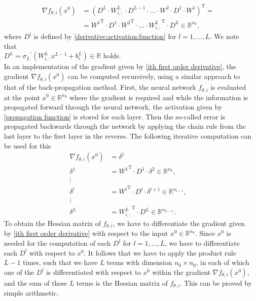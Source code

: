 \begin{equation} 
    \label{ith first order derivative}
    \begin{aligned}
        \nabla f_{\theta, i} \left(x^0\right) & = \left( D^L \cdot W^L_{i,:} \cdot D^{L-1} \cdot \ldots \cdot W^2 \cdot D^1 \cdot W^{1} \right)^{\mathrm{T}} = \\
        & = {W^{1}}^{\mathrm{T}} \cdot D^{1} \cdot {W^{2}}^{\mathrm{T}} \cdot \ldots \cdot {W^L_{i,:}}^{\mathrm{T}}  \cdot  D^{L} \in \mathbb{R}^{n_0}, 
    \end{aligned} 
\end{equation} 
where $D^l$ is defined by \cref{derivative:activation:function} for $l = 1, \ldots, L$. We note that \\
$D^L = {\sigma_{L}}^{\prime} \left( W^L_{i,:} x^{L-1} + b^{L}_{i} \right) \in \mathbb{R}$ holds.  \\
In an implementation of the gradient given by \cref{ith first order derivative}, the gradient $\nabla f_{\theta, i} \left(x^0\right)$ can be computed recursively, using a similar approach to that of the back-propagation method. First, the neural network $f_{\theta, i}$ is evaluated at the point $x^0 \in \mathbb{R}^{n_0}$ where the gradient is required and while the information is propagated forward through the neural network, the activation given by \cref{propagation function} is stored for each layer. Then the so-called error is propagated backwards through the network by applying the chain rule from the last layer to the first layer in the reverse. The following iterative computation can be used for this
\begin{equation} 
    \label{gradient recursive}
    \begin{aligned}
        \nabla f_{\theta, i} \left(x^0\right) & = \delta^1 \\
        \delta^1 & = {W^{1}}^{\mathrm{T}} \cdot D^{1} \cdot \delta^2 \in \mathbb{R}^{n_0}, \\
        \vdots & \\
        \delta^l & = {W^{l}}^{\mathrm{T}} \cdot D^{l} \cdot \delta^{l+1} \in \mathbb{R}^{n_{l-1}}, \\
        \vdots & \\
        \delta^{L} & = {W^L_{i,:}}^{\mathrm{T}} \cdot D^{L} \in \mathbb{R}^{n_{L-1}}.
    \end{aligned} 
\end{equation} 
To obtain the Hessian matrix of $f_{\theta, i}$, we have to differentiate the gradient given by \cref{ith first order derivative} with respect to the input $x^0 \in \mathbb{R}^{n_0}$. Since $x^0$ is needed for the computation of each $D^l$ for $l = 1, \ldots, L$, we have to differentiate each $D^l$ with respect to $x^0$. It follows that we have to apply the product rule $L-1$ times, such that we have $L$ terms with dimension $n_0 \times n_0$, in each of which one of the $D^l$ is differentiated with respect to $x^0$ within the gradient $\nabla f_{\theta, i} \left(x^0\right)$, and the sum of these $L$ terms is the Hessian matrix of $f_{\theta, i}$. This can be proved by simple arithmetic. \\
